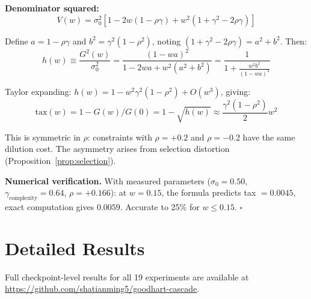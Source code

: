 \documentclass{article}
\begin{document}
\textbf{Denominator squared:}
\begin{equation}
    V(w) = \sigma_0^2[1 - 2w(1-\rho\gamma) + w^2(1+\gamma^2-2\rho\gamma)]
\end{equation}

Define $a = 1-\rho\gamma$ and $b^2 = \gamma^2(1-\rho^2)$, noting $(1+\gamma^2-2\rho\gamma) = a^2 + b^2$. Then:
\begin{equation}
    h(w) \equiv \frac{G^2(w)}{\sigma_0^2} = \frac{(1-wa)^2}{1 - 2wa + w^2(a^2+b^2)} = \frac{1}{1 + \frac{w^2 b^2}{(1-wa)^2}}
\end{equation}

Taylor expanding: $h(w) = 1 - w^2\gamma^2(1-\rho^2) + O(w^3)$, giving:
\begin{equation}
    \mathrm{tax}(w) = 1 - G(w)/G(0) = 1 - \sqrt{h(w)} \approx \frac{\gamma^2(1-\rho^2)}{2}w^2
\end{equation}

This is symmetric in $\rho$: constraints with $\rho = +0.2$ and $\rho = -0.2$ have the same dilution cost. The asymmetry arises from selection distortion (Proposition~\ref{prop:selection}).

\textbf{Numerical verification.} With measured parameters ($\sigma_0 = 0.50$, $\gamma_{\text{complexity}} = 0.64$, $\rho = +0.166$): at $w = 0.15$, the formula predicts tax $= 0.0045$, exact computation gives $0.0059$. Accurate to 25\% for $w \leq 0.15$. $\square$

\section{Detailed Results}
\label{app:details}

Full checkpoint-level results for all 19 experiments are available at \url{https://github.com/shatianming5/goodhart-cascade}.
\end{document}
